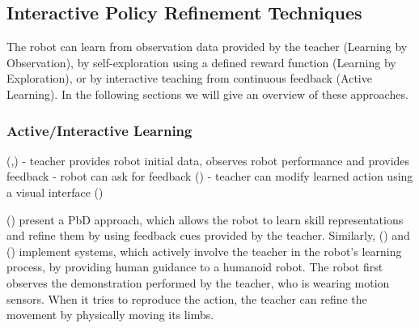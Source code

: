 \subsection{Interactive Policy Refinement Techniques}\label{subsec:Other RP Methods}
The robot can learn from observation data provided by the teacher (Learning by Observation), by self-exploration using a defined reward function (Learning by Exploration), or by interactive teaching from continuous feedback (Active Learning). In the following sections we will give an overview of these approaches.

\subsubsection{Active/Interactive Learning}\label{sssec:Active Learning} (\cite{chernova2014robot},\cite{calinon2007active})
 - teacher provides robot initial data, observes robot performance and provides feedback
     - robot can ask for feedback (\cite{cakmak2012aaai})
 - teacher can modify learned action using a visual interface (\cite{alexandrova2015roboflow})

 (\cite{nicolescu2003natural}) present a PbD approach, which allows the robot to learn skill representations and refine them by using feedback cues provided by the teacher.
Similarly, (\cite{calinon2007active}) and (\cite{calinon2007incremental}) implement systems, which actively involve the teacher in the robot's learning process, by providing human guidance to a humanoid robot. The robot first observes the demonstration performed by the teacher, who is wearing motion sensors. When it tries to reproduce the action, the teacher can refine the movement by physically moving its limbs.

